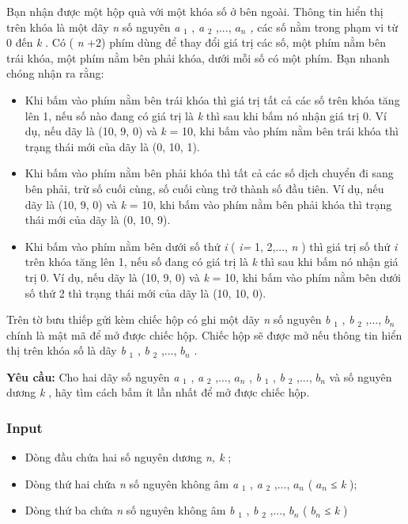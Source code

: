 

Bạn nhận được một hộp quà với một khóa số ở bên ngoài. Thông tin hiển thị trên khóa là một dãy \emph{ n } số nguyên \emph{ a }$_ 1 $ , \emph{ a }$_ 2 $ ,..., \emph{ $a_{n}$ , } các số nằm trong phạm vi từ 0 đến \emph{ k } . Có ( \emph{ n } +2) phím dùng để thay đổi giá trị các số, một phím nằm bên trái khóa, một phím nằm bên phải khóa, dưới mỗi số có một phím. Bạn nhanh chóng nhận ra rằng:
\begin{itemize}
	\item Khi bấm vào phím nằm bên trái khóa thì giá trị tất cả các số trên khóa tăng lên 1, nếu số nào đang có giá trị là \emph{ k } thì sau khi bấm nó nhận giá trị 0. Ví dụ, nếu dãy là (10, 9, 0) và \emph{ k } = 10, khi bấm vào phím nằm bên trái khóa thì trạng thái mới của dãy là (0, 10, 1).
	\item Khi bấm vào phím nằm bên phải khóa thì tất cả các số dịch chuyển đi sang bên phải, trừ số cuối cùng, số cuối cùng trở thành số đầu tiên. Ví dụ, nếu dãy là (10, 9, 0) và \emph{ k } = 10, khi bấm vào phím nằm bên phải khóa thì trạng thái mới của dãy là (0, 10, 9).
	\item Khi bấm vào phím nằm bên dưới số thứ \emph{ i } ( \emph{ i= } 1, 2,..., \emph{ n } ) thì giá trị số thứ \emph{ i } trên khóa tăng lên 1, nếu số đang có giá trị là \emph{ k } thì sau khi bấm nó nhận giá trị 0. Ví dụ, nếu dãy là (10, 9, 0) và \emph{ k } = 10, khi bấm vào phím nằm bên dưới số thứ 2 thì trạng thái mới của dãy là (10, 10, 0).
\end{itemize}

Trên tờ bưu thiếp gửi kèm chiếc hộp có ghi một dãy \emph{ n } số nguyên \emph{ b }$_ 1 $ , \emph{ b }$_ 2 $ ,..., \emph{ $b_{n}$} chính là mật mã để mở được chiếc hộp. Chiếc hộp sẽ được mở nếu thông tin hiển thị trên khóa số là dãy \emph{ b }$_ 1 $ , \emph{ b }$_ 2 $ ,..., \emph{ $b_{n}$} .

\textbf{Yêu cầu: } Cho hai dãy số nguyên \emph{ a }$_ 1 $ , \emph{ a }$_ 2 $ ,..., \emph{ $a_{n}$} , \emph{ b }$_ 1 $ , \emph{ b }$_ 2 $ ,..., \emph{ $b_{n}$} và số nguyên dương \emph{ k } , hãy tìm cách bấm ít lần nhất để mở được chiếc hộp.

\subsubsection{Input}
\begin{itemize}
	\item Dòng đầu chứa hai số nguyên dương \emph{ n, k } ;
	\item Dòng thứ hai chứa \emph{ n } số nguyên không âm \emph{ a }$_ 1 $ , \emph{ a }$_ 2 $ ,..., \emph{ $a_{n}$} ( \emph{ $a_{n}$} ≤ \emph{ k } );
	\item Dòng thứ ba chứa \emph{ n } số nguyên không âm \emph{ b }$_ 1 $ , \emph{ b }$_ 2 $ ,..., \emph{ $b_{n}$} ( \emph{ $b_{n}$} ≤ \emph{ k } )
\end{itemize}

